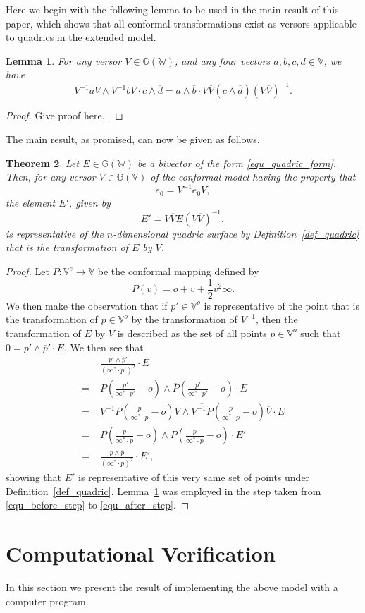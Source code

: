 \documentclass{birkjour}
\newtheorem{thm}{Theorem}[section]
\newtheorem{lem}[thm]{Lemma}
\theoremstyle{definition}
\theoremstyle{remark}
\numberwithin{equation}{section}
\newcommand{\G}{\mathbb{G}}
\newcommand{\V}{\mathbb{V}}
\newcommand{\W}{\mathbb{W}}
\newcommand{\nvao}{o}
\newcommand{\nvai}{\infty}
\begin{document}
Here we begin with the following lemma to be used in the main result
of this paper, which shows that all conformal transformations exist
as versors applicable to quadrics in the extended model.
\begin{lem}\label{lma_versor_transfer}
For any versor $V\in\G(\W)$, and any four vectors $a,b,c,d\in\V$, we have
\begin{equation}
V^{-1}aV\wedge\overline{V^{-1}bV}\cdot c\wedge\overline{d} =
a\wedge\overline{b}\cdot V\overline{V}(c\wedge\overline{d})(V\overline{V})^{-1}.
\end{equation}
\end{lem}
\begin{proof}
Give proof here...
\end{proof}
The main result, as promised, can now be given as follows.
\begin{thm}
Let $E\in\G(\W)$ be a bivector of the form \eqref{equ_quadric_form}.
Then, for any versor $V\in\G(\V)$ of the conformal model having the property that
\begin{equation}
e_0=V^{-1}e_0V,
\end{equation}
the element $E'$, given by
\begin{equation}
E' = V\overline{V}E(V\overline{V})^{-1},
\end{equation}
is representative of the $n$-dimensional quadric surface by Definition~\ref{def_quadric}
that is the transformation of $E$ by $V$.
\end{thm}
\begin{proof}
Let $P:\V^e\to\V$ be the conformal mapping defined by
\begin{equation}
P(v) = \nvao + v + \frac{1}{2}v^2\nvai.
\end{equation}
We then make the observation that if $p'\in\V^o$ is representative of
the point that is the transformation of $p\in\V^o$ by the transformation
of $V^{-1}$, then the transformation of $E$ by $V$ is described as the set of
all points $p\in\V^o$ such that $0=p'\wedge\overline{p}'\cdot E$.
We then see that
\begin{align}
 & \frac{p'\wedge\overline{p}'}{(\nvai^*\cdot p')^2}\cdot E \\
=\;& P\left(\frac{p'}{\nvai^*\cdot p'}-\nvao\right)
\wedge\overline{P}\left(\frac{p'}{\nvai^*\cdot p'}-\nvao\right)\cdot E \\
=\;& V^{-1}P\left(\frac{p}{\nvai^*\cdot p}-\nvao\right)V
\wedge\overline{V^{-1}P}\left(\frac{p}{\nvai^*\cdot p}-\nvao\right)\overline{V}\cdot E\label{equ_before_step} \\
=\;& P\left(\frac{p}{\nvai^*\cdot p}-\nvao\right)\wedge
\overline{P}\left(\frac{p}{\nvai^*\cdot p}-\nvao\right)\cdot E'\label{equ_after_step} \\
=\;& \frac{p\wedge\overline{p}}{(\nvai^*\cdot p)^2}\cdot E',
\end{align}
showing that $E'$ is representative of this very same set of
points under Definition~\ref{def_quadric}.  Lemma~\ref{lma_versor_transfer}
was employed in the step taken from \eqref{equ_before_step} to \eqref{equ_after_step}.
\end{proof}

\section{Computational Verification}

In this section we present the result of implementing the above
model with a computer program.



\end{document}
